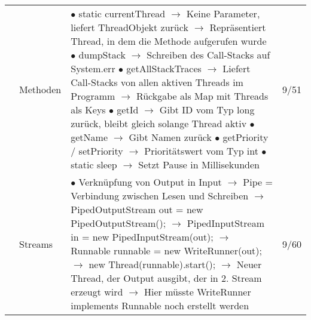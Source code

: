 \documentclass[11pt,a4paper]{article}
\begin{document}
\begin{center}
\begin{longtable}[h]{ | p{2.3cm} | p{2.3cm} | p{12.6cm} | p{1.2cm} | }
	& Methoden & \makecell[l]{$\bullet$ static currentThread \\
	\hspace{0.4cm} $\rightarrow$ Keine Parameter, liefert ThreadObjekt zurück \\
	\hspace{0.4cm} $\rightarrow$ Repräsentiert Thread, in dem die Methode aufgerufen wurde \\
	$\bullet$ dumpStack \\
	\hspace{0.4cm} $\rightarrow$ Schreiben des Call-Stacks auf System.err \\
	$\bullet$ getAllStackTraces \\
	\hspace{0.4cm} $\rightarrow$ Liefert Call-Stacks von allen aktiven Threads im Programm \\
	\hspace{0.4cm} $\rightarrow$ Rückgabe als Map mit Threads als Keys \\
	$\bullet$ getId \\
	\hspace{0.4cm} $\rightarrow$ Gibt ID vom Typ long zurück, bleibt gleich solange Thread aktiv \\
	$\bullet$ getName \\
	\hspace{0.4cm} $\rightarrow$ Gibt Namen zurück \\
	$\bullet$ getPriority / setPriority \\
	\hspace{0.4cm} $\rightarrow$ Prioritätswert vom Typ int
	 $\bullet$ static sleep \\
	 \hspace{0.4cm} $\rightarrow$  Setzt Pause in Millisekunden }  & 9/51 \\ \cline{2-4}
	
	& Streams & \makecell[l]{$\bullet$ Verknüpfung von Output in Input \\
	\hspace{0.4cm} $\rightarrow$ Pipe = Verbindung zwischen Lesen und Schreiben \\
	\hspace{0.4cm} $\rightarrow$ PipedOutputStream out = new PipedOutputStream(); \\
	\hspace{0.4cm} $\rightarrow$ PipedInputStream in = new PipedInputStream(out); \\
	\hspace{0.4cm} $\rightarrow$ Runnable runnable = new WriteRunner(out); \\
	\hspace{0.4cm} $\rightarrow$ new Thread(runnable).start(); \\
	\hspace{0.4cm} $\rightarrow$ Neuer Thread, der Output ausgibt, der in 2. Stream erzeugt wird \\
	\hspace{0.4cm} $\rightarrow$ Hier müsste WriteRunner implements Runnable noch erstellt werden}  & 9/60 \\ \cline{2-4}
	

\end{longtable}
\end{center}
\end{document}
